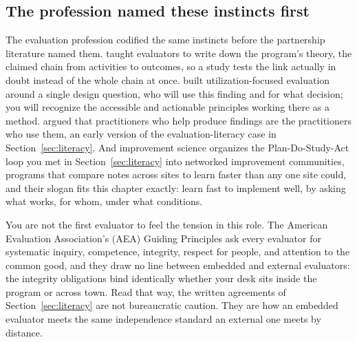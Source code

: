 \documentclass[
    a4paper,
    fontsize=10pt,
    twoside=true,
    numbers=noenddot,
]{kaobook}
\begin{document}
\subsection{The profession named these instincts first}\label{sec:ch01-profession-instincts}
The evaluation profession codified the same instincts before the partnership literature named them. \textcite{weiss1998evaluation} taught evaluators to write down the program's theory, the claimed chain from activities to outcomes, so a study tests the link actually in doubt instead of the whole chain at once. \textcite{patton2008utilization} built utilization-focused evaluation around a single design question, who will use this finding and for what decision; you will recognize the accessible and actionable principles working there as a method. \textcite{cousins1992participatory} argued that practitioners who help produce findings are the practitioners who use them, an early version of the evaluation-literacy case in Section~\ref{sec:literacy}. And improvement science \parencite{bryk2015improve} organizes the Plan-Do-Study-Act loop you met in Section~\ref{sec:literacy} into networked improvement communities, programs that compare notes across sites to learn faster than any one site could, and their slogan fits this chapter exactly: learn fast to implement well, by asking what works, for whom, under what conditions.

You are not the first evaluator to feel the tension in this role. The American Evaluation Association's (AEA) Guiding Principles \parencite{aea2018principles} ask every evaluator for systematic inquiry, competence, integrity, respect for people, and attention to the common good, and they draw no line between embedded and external evaluators: the integrity obligations bind identically whether your desk sits inside the program or across town. Read that way, the written agreements of Section~\ref{sec:literacy} are not bureaucratic caution. They are how an embedded evaluator meets the same independence standard an external one meets by distance.
\end{document}
